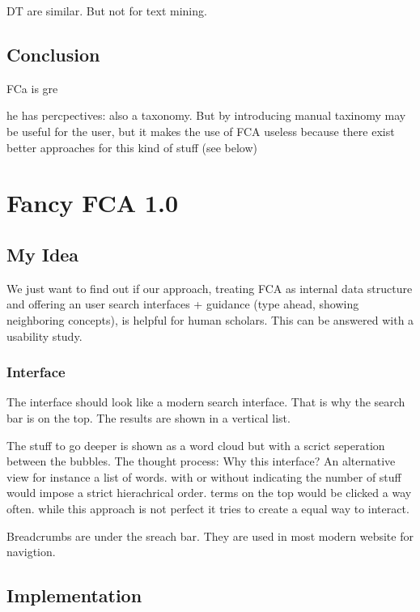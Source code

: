 \documentclass[11pt]{report}
\begin{document}
DT are similar. But not for text mining. 

\section{Conclusion}

FCa is gre

 he has percpectives: also a taxonomy. But by introducing  manual taxinomy may be useful for the user, but it makes the use of FCA useless because there exist better approaches for this kind of stuff (see below)











\chapter{Fancy FCA 1.0}

\section{My Idea}

We just want to find out if our approach, treating FCA as internal data structure and offering an user search interfaces + guidance (type ahead, showing neighboring concepts), is helpful for human scholars. This can be answered with a usability study.

\subsection{Interface}

The interface should look like a modern search interface. That is why the search bar is on the top. The results are shown in a vertical list. 

The stuff to go deeper is shown as a word cloud but with a scrict seperation between the bubbles. The thought process: Why this interface? An alternative view for instance a list of words. with or without indicating the number of stuff would impose a strict hierachrical order. terms on the top would be clicked a way often. while this approach is not perfect it tries to create a equal way to interact.

Breadcrumbs are under the sreach bar. They are used in most modern website for navigtion.

\section{Implementation}
\end{document}
